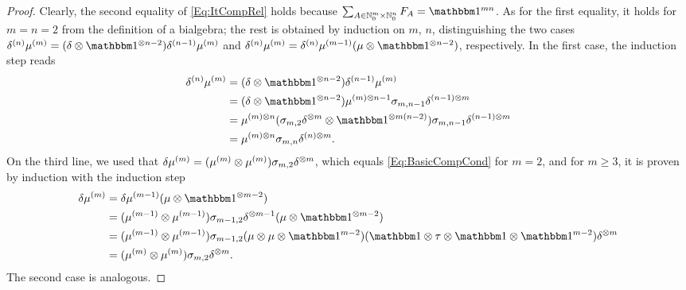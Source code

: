 \documentclass[\MainFolder/Text.tex]{subfiles}
\begin{document}
\begin{proof}
Clearly, the second equality of \eqref{Eq:ItCompRel} holds because $\sum_{A\in \N_0^m\times\N_0^n} F_A = \Id^{mn}$. As for the first equality, it holds for $m=n=2$ from the definition of a bialgebra; the rest is obtained by induction on $m$, $n$, distinguishing the two cases $\MVCoProd^{(n)}\MVProd^{(m)} = (\MVCoProd\otimes\Id^{\otimes n-2})\MVCoProd^{(n-1)}\MVProd^{(m)}$ and $\MVCoProd^{(n)}\MVProd^{(m)} = \MVCoProd^{(n)}\MVProd^{(m-1)}(\mu\otimes\Id^{\otimes n-2})$, respectively. In the first case, the induction step reads
\begin{align*}
\MVCoProd^{(n)}\MVProd^{(m)} & = (\MVCoProd\otimes\Id^{\otimes n-2})\MVCoProd^{(n-1)}\MVProd^{(m)} \\
& = (\MVCoProd\otimes\Id^{\otimes n-2})\MVProd^{(m)\otimes n-1}\sigma_{m,n-1}\MVCoProd^{(n-1)\otimes m} \\
& = \MVProd^{(m)\otimes n}(\sigma_{m,2} \MVCoProd^{\otimes m} \otimes \Id^{\otimes m(n-2)})\sigma_{m,n-1}\MVCoProd^{(n-1)\otimes m} \\
& = \MVProd^{(m)\otimes n} \sigma_{m,n} \delta^{(n)\otimes m}.
\end{align*}
On the third line, we used that $\delta\mu^{(m)}=(\mu^{(m)}\otimes\mu^{(m)})\sigma_{m,2}\delta^{\otimes m}$, which equals \eqref{Eq:BasicCompCond} for $m=2$, and for $m\ge 3$, it is proven by induction with the induction step
\begin{align*}
 \MVCoProd\MVProd^{(m)} & = \MVCoProd\MVProd^{(m-1)}(\MVProd\otimes\Id^{\otimes m-2}) \\
 & = (\MVProd^{(m-1)}\otimes\MVProd^{(m-1)})\sigma_{m-1,2}\MVCoProd^{\otimes m-1}(\MVProd\otimes\Id^{\otimes m-2}) \\
 & = (\MVProd^{(m-1)}\otimes\MVProd^{(m-1)})\sigma_{m-1,2}(\MVProd\otimes\MVProd \otimes\Id^{m-2})(\Id \otimes \tau\otimes \Id \otimes \Id^{m-2})\MVCoProd^{\otimes m} \\
 & = (\MVProd^{(m)}\otimes\MVProd^{(m)})\sigma_{m,2}\MVCoProd^{\otimes m}.
\end{align*}
The second case is analogous.
\end{proof}
\end{document}
